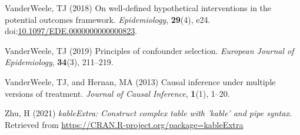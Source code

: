 \documentclass[
  singlecolumn]{article}
\newlength{\cslhangindent}
\newenvironment{CSLReferences}[2] %
 {\begin{list}{}{%
  \setlength{\itemindent}{0pt}
  \setlength{\leftmargin}{0pt}
  \setlength{\parsep}{0pt}
  \ifodd #1
   \setlength{\leftmargin}{\cslhangindent}
   \setlength{\itemindent}{-1\cslhangindent}
  \fi
  \setlength{\itemsep}{#2\baselineskip}}}
 {\end{list}}
\begin{document}
\begin{CSLReferences}{1}{0}
VanderWeele, TJ (2018) On well-defined hypothetical interventions in the
potential outcomes framework. \emph{Epidemiology}, \textbf{29}(4), e24.
doi:\href{https://doi.org/10.1097/EDE.0000000000000823}{10.1097/EDE.0000000000000823}.

VanderWeele, TJ (2019) Principles of confounder selection.
\emph{European Journal of Epidemiology}, \textbf{34}(3), 211--219.

VanderWeele, TJ, and Hernan, MA (2013) Causal inference under multiple
versions of treatment. \emph{Journal of Causal Inference},
\textbf{1}(1), 1--20.

Zhu, H (2021) \emph{kableExtra: Construct complex table with 'kable' and
pipe syntax}. Retrieved from
\url{https://CRAN.R-project.org/package=kableExtra}

\end{CSLReferences}
\end{document}
